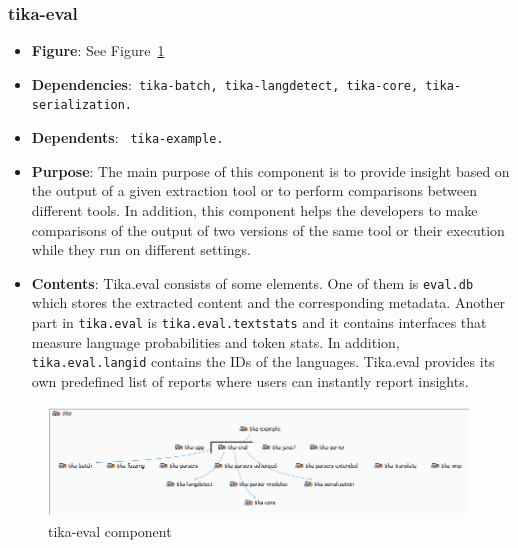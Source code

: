 \documentclass{article}
\begin{document}
\subsubsection{tika-eval}
\begin {itemize}
\item \textbf{Figure}: See Figure~\ref{fig:tika-eval}
\item \textbf{Dependencies}:\texttt{ tika-batch, tika-langdetect, tika-core, tika-serialization.}
\item \textbf{Dependents}: \texttt{ tika-example.}
\item \textbf{Purpose}: The main purpose of this component is to provide insight based on the output of a given extraction tool or to perform comparisons between different tools. In addition, this component helps the developers to make comparisons of the output of two versions of the same tool or their execution while they run on different settings. 
\item \textbf{Contents}: Tika.eval consists of some elements. One of them is \texttt{eval.db} which stores the extracted content and the corresponding metadata. Another part in \texttt{tika.eval} is \texttt{tika.eval.textstats} and it contains interfaces that measure language probabilities and token stats.  In addition, \\\texttt{tika.eval.langid} contains the IDs of the languages. Tika.eval provides its own predefined list of reports where users can instantly report insights. 
\end{itemize}
\begin{figure}[ht]
    \centering
    \includegraphics[width=1\textwidth]{report/images/tika-eval.PNG}
    \caption{tika-eval component}
    \label{fig:tika-eval}
\end{figure}
\end{document}
